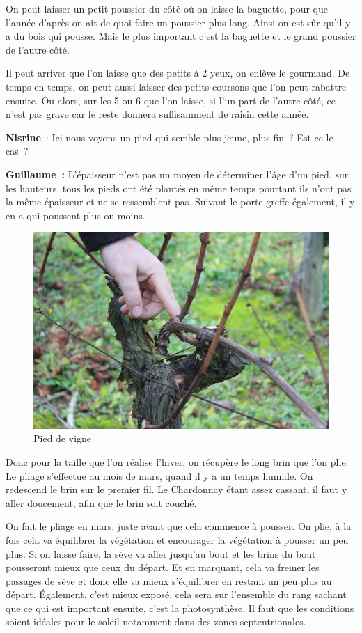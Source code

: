 \documentclass[a4paper, titlepage]{report}
\begin{document}
On peut laisser un petit poussier du côté où on laisse la baguette, pour
que l'année d'après on ait de quoi faire un poussier plus long. Ainsi on
est sûr qu'il y a du bois qui pousse. Mais le plus important c'est la
baguette et le grand poussier de l'autre côté.

Il peut arriver que l'on laisse que des petits à 2 yeux, on enlève le
gourmand. De temps en temps, on peut aussi laisser des petits coursons
que l'on peut rabattre ensuite. Ou alors, sur les 5 ou 6 que l'on
laisse, si l'un part de l'autre côté, ce n'est pas grave car le reste
donnera suffisamment de raisin cette année.

\textbf{Nisrine}~: Ici nous voyons un pied qui semble plus jeune, plus
fin~? Est-ce le cas~?

\textbf{Guillaume~:} L'épaisseur n'est pas un moyen de déterminer l'âge
d'un pied, sur les hauteurs, tous les pieds ont été plantés en même
temps pourtant ils n'ont pas la même épaisseur et ne se ressemblent pas.
Suivant le porte-greffe également, il y en a qui poussent plus ou moins.

\begin{figure}[!h]
\includegraphics{Images/pied.jpg}
\caption{Pied de vigne}
\end{figure}

Donc pour la taille que l'on réalise
l'hiver, on récupère le long brin que l'on plie. Le pliage s'effectue au
mois de mars, quand il y a un temps humide. On redescend le brin sur le
premier fil. Le Chardonnay étant assez cassant, il faut y
aller doucement, afin que le brin soit couché.

On fait le pliage en mars, juste avant que cela commence à pousser. On
plie, à la fois cela va équilibrer la végétation et encourager la
végétation à pousser un peu plus. Si on laisse faire, la sève va aller
jusqu'au bout et les brins du bout pousseront mieux que ceux du départ.
Et en marquant, cela va freiner les passages de sève et donc elle va
mieux s'équilibrer en restant un peu plus au départ. Également, c'est
mieux exposé, cela sera sur l'ensemble du rang sachant que ce qui est
important ensuite, c'est la photosynthèse. Il faut que les conditions
soient idéales pour le soleil notamment dans des zones septentrionales.
\end{document}
